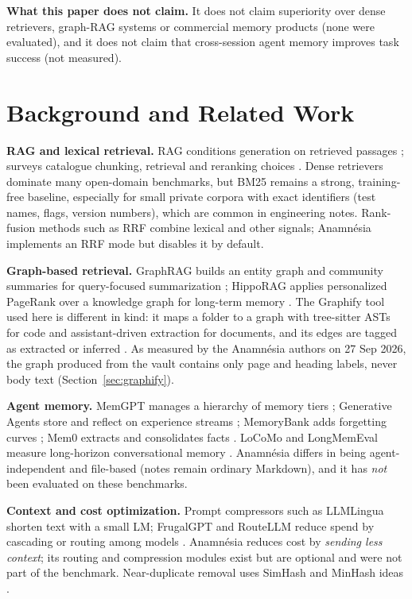 \documentclass[conference,onecolumn,11pt]{IEEEtran}
\newcommand{\anam}{Anam\-n\'esia}
\begin{document}
\textbf{What this paper does not claim.} It does not claim superiority over dense retrievers, graph-RAG systems or commercial memory products (none were evaluated), and it does not claim that cross-session agent memory improves task success (not measured).

\section{Background and Related Work}
\textbf{RAG and lexical retrieval.} RAG conditions generation on retrieved passages \cite{lewis2020rag}; surveys catalogue chunking, retrieval and reranking choices \cite{gao2023ragsurvey}. Dense retrievers \cite{karpukhin2020dpr} dominate many open-domain benchmarks, but BM25 \cite{robertson2009bm25} remains a strong, training-free baseline, especially for small private corpora with exact identifiers (test names, flags, version numbers), which are common in engineering notes. Rank-fusion methods such as RRF \cite{cormack2009rrf} combine lexical and other signals; \anam{} implements an RRF mode but disables it by default.

\textbf{Graph-based retrieval.} GraphRAG builds an entity graph and community summaries for query-focused summarization \cite{edge2024graphrag}; HippoRAG applies personalized PageRank over a knowledge graph for long-term memory \cite{gutierrez2024hipporag,page1999pagerank}. The Graphify tool used here is different in kind: it maps a folder to a graph with tree-sitter ASTs for code and assistant-driven extraction for documents, and its edges are tagged as extracted or inferred \cite{graphify}. As measured by the \anam{} authors on 27 Sep 2026, the graph produced from the vault contains only page and heading labels, never body text (Section~\ref{sec:graphify}).

\textbf{Agent memory.} MemGPT manages a hierarchy of memory tiers \cite{packer2023memgpt}; Generative Agents store and reflect on experience streams \cite{park2023generative}; MemoryBank adds forgetting curves \cite{zhong2024memorybank}; Mem0 extracts and consolidates facts \cite{chhikara2025mem0}. LoCoMo and LongMemEval measure long-horizon conversational memory \cite{maharana2024locomo,wu2025longmemeval}. \anam{} differs in being agent-independent and file-based (notes remain ordinary Markdown), and it has \emph{not} been evaluated on these benchmarks.

\textbf{Context and cost optimization.} Prompt compressors such as LLMLingua \cite{jiang2023llmlingua,jiang2023longllmlingua} shorten text with a small LM; FrugalGPT and RouteLLM reduce spend by cascading or routing among models \cite{chen2023frugalgpt,ong2024routellm}. \anam{} reduces cost by \emph{sending less context}; its routing and compression modules exist but are optional and were not part of the benchmark. Near-duplicate removal uses SimHash and MinHash ideas \cite{charikar2002simhash,manku2007nearduplicates,broder1997resemblance}.
\end{document}
